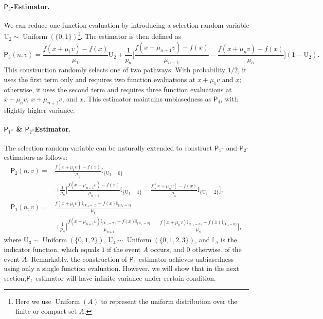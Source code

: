 \documentclass{article}
\theoremstyle{definition}
\theoremstyle{plain}
\theoremstyle{remark}
\newcommand{\sfP}{\mathsf{P}}
\begin{document}
\paragraph{\(\mathsf{P}_3\)-Estimator.}  
We can reduce one function evaluation by introducing a selection random variable $\mathrm{U}_2\sim  \operatorname{Uniform}\left( \{ 0, 1 \}\right)$\footnote{Here we use $\operatorname{Uniform}(A)$ to represent the uniform distribution over the finite or compact set $A$.}. The estimator is then defined as
\begin{equation}
\mathsf{P}_3(n, v)= \frac{f(x+\mu_1 v)-f(x)}{\mu_1}\mathrm{U}_2 + \frac{1}{p_n}\Biggl[ \frac{f(x+\mu_{n+1} v)-f(x)}{\mu_{n+1}} - \frac{f(x+\mu_n v)-f(x)}{\mu_n} \Biggr](1-\mathrm{U}_2). \label{eq:P3_def}
\end{equation}
This construction randomly selects one of two pathways:  With probability \(1/2\), it uses the first term only and requires two function evaluations at \(x+\mu_1 v\) and \(x\); otherwise, it uses the second term and requires three function evaluations at \(x+\mu_n v\), \(x+\mu_{n+1} v\), and \(x\).  This estimator maintains unbiasedness as \(\mathsf{P}_4\), with slightly higher variance. 

 
\paragraph{\(\mathsf{P}_1\)- \& \(\mathsf{P}_2\)-Estimator.} The selection random variable can be naturally extended to construct \(\mathsf{P}_1\)- and \(\mathsf{P}_2\)-estimators as follows:
\begin{align}
\mathsf{P}_2(n, v)= &\frac{f(x+\mu_1 v)-f(x)}{\mu_1}\mathbb{I}_{\{\mathrm{U}_3=0\}} \label{eq:P2_def}\\ 
&+ \frac{1}{p_n}\Biggl[ \frac{f(x+\mu_{n+1} v)-f(x)}{\mu_{n+1}}\mathbb{I}_{\{\mathrm{U}_3=1\}} - \frac{f(x+\mu_n v)-f(x)}{\mu_n}\mathbb{I}_{\{\mathrm{U}_3=2\}} \Biggr] , \nonumber \\
\mathsf{P}_1(n, v)= &\frac{f(x+\mu_1 v)\mathbb{I}_{\{\mathrm{U}_4=1\}}-f(x)\mathbb{I}_{\{\mathrm{U}_4=0\}}}{\mu_1} \label{eq:P1_def}\\ 
&+ \frac{1}{p_n}\Biggl[ \frac{f(x+\mu_{n+1} v)\mathbb{I}_{\{\mathrm{U}_4=2\}}-f(x)\mathbb{I}_{\{\mathrm{U}_4=0\}}}{\mu_{n+1}}  - \frac{f(x+\mu_n v)\mathbb{I}_{\{\mathrm{U}_4=3\}}-f(x)\mathbb{I}_{\{\mathrm{U}_4=0\}}}{\mu_n}  \Biggr] , \nonumber
\end{align} 
where $\mathrm{U}_3 \sim \operatorname{Uniform}\left( \{ 0, 1,2 \}\right)$, $\mathrm{U}_4 \sim \operatorname{Uniform}\left( \{ 0, 1,2,3 \}\right)$, and $\mathbb{I}_{A}$ is the indicator function, which equals $1$ if the event $A$ occurs, and $0$ otherwise. of the event $A$. Remarkably, the construction of $\sfP_1$-estimator achieves unbiasedness using only a single function evaluation. However, we will show that in the next section,$\sfP_1$-estimator will have infinite variance under certain condition.  
\end{document}
